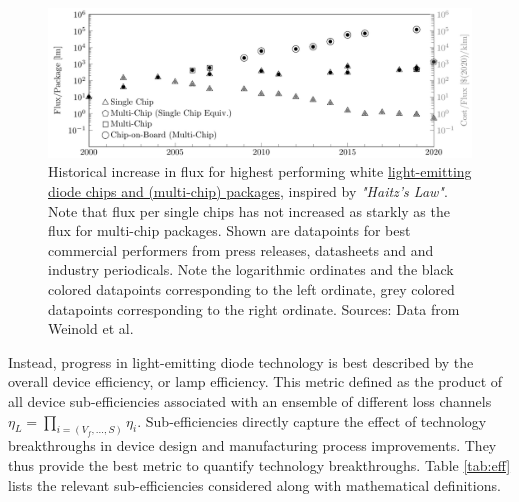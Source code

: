 \documentclass[a4paper,nocompress]{spie}  %
\begin{document}
    \begin{figure} [ht]
        \begin{center}
            \includegraphics[width=\textwidth]{haitz_law_white.pdf}
        \end{center}
        \caption{Historical increase in flux for highest performing white \underline{light-emitting diode chips and (multi-chip) packages}, inspired by \textit{"Haitz's Law"}\cite{haitz1999case}. Note that flux per single chips has not increased as starkly as the flux for multi-chip packages. Shown are datapoints for best commercial performers from press releases, datasheets and and industry periodicals. Note the logarithmic ordinates and the black colored datapoints corresponding to the left ordinate, grey colored datapoints corresponding to the right ordinate. Sources: Data from Weinold et al. \cite{weinold2020technology}}
        \label{fig:haitz}
    \end{figure}

    Instead, progress in light-emitting diode technology is best described by the overall device efficiency, or lamp efficiency. This metric defined as the product of all device sub-efficiencies associated with an ensemble of different loss channels $\eta_L = \prod_{i=(V_f,\dots,S)} \eta_i$. Sub-efficiencies directly capture the effect of technology breakthroughs in device design and manufacturing process improvements. They thus provide the best metric to quantify technology breakthroughs. Table \ref{tab:eff} lists the relevant sub-efficiencies considered along with mathematical definitions.
\end{document}
